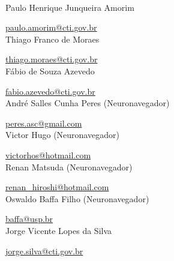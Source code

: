 \scalebox{2.0}{\sffamily Autores do Manual}
\\

Paulo Henrique Junqueira Amorim

\href{mailto:paulo.amorim@cti.gov.br}{paulo.amorim@cti.gov.br}
\\


Thiago Franco de Moraes


\href{mailto:thiago.moraes@cti.gov.br}{thiago.moraes@cti.gov.br}
\\

Fábio de Souza Azevedo


\href{mailto:fabio.azevedo@cti.gov.br}{fabio.azevedo@cti.gov.br}
\\


André Salles Cunha Peres (Neuronavegador)

\href{mailto:peres.asc@gmail.com}{peres.asc@gmail.com}
\\

Victor Hugo (Neuronavegador)

\href{mailto:victorhos@hotmail.com}{victorhos@hotmail.com}
\\


Renan Matsuda (Neuronavegador)

\href{mailto:renan\_hiroshi@hotmail.com}{renan\_hiroshi@hotmail.com}
\\


Oswaldo Baffa Filho (Neuronavegador)

\href{mailto:baffa@usp.br}{baffa@usp.br}
\\

Jorge Vicente Lopes da Silva


\href{mailto:jorge.silva@cti.gov.br}{jorge.silva@cti.gov.br}
\\

